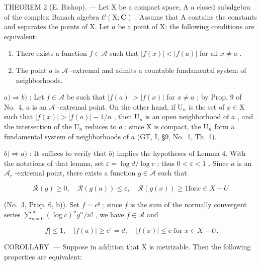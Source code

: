 THEOREM 2 (E. Bishop). --- Let X be a compact space, A a closed subalgebra of the complex Banach algebra \(\mathcal{C}(\mathrm{X};\mathbf{C})\) . Assume that A contains the constants and separates the points of X. Let \(a\) be a point of X; the following conditions are equivalent:

\begin{enumerate}
\def\labelenumi{\alph{enumi})}
\item
  There exists a function \(f \in \mathcal{A}\) such that \(|f(x)| < |f(a)|\) for all \(x \neq a\) .
\item
  The point \(a\) is \(\mathcal{A}\) -extremal and admits a countable fundamental system of neighborhoods.
\end{enumerate}

\(a) \Rightarrow b)\) : Let \(f \in \mathcal{A}\) be such that \(|f(a)| > |f(x)|\) for \(x \neq a\) ; by Prop. 9 of No.~4, \(a\) is an \(\mathcal{A}\) -extremal point. On the other hand, if \(\mathrm{U}_n\) is the set of \(x \in \mathrm{X}\) such that \(|f(x)| > |f(a)| - 1/n\) , then \(\mathrm{U}_n\) is an open neighborhood of \(a\) , and the intersection of the \(\mathrm{U}_n\) reduces to \(a\) ; since \(\mathrm{X}\) is compact, the \(\mathrm{U}_n\) form a fundamental system of neighborhoods of \(a\) (GT, I, §9, No.~1, Th. 1).

\(b) \Rightarrow a)\) : It suffices to verify that \(b)\) implies the hypotheses of Lemma 4. With the notations of that lemma, set \(\varepsilon = \log d / \log c\) ; thus \(0 < \varepsilon < 1\) . Since \(a\) is an \(\mathcal{A}_r\) -extremal point, there exists a function \(g \in \dot{\mathcal{A}}\) such that

\[
\mathcal {R} (g) \geqslant 0, \quad \mathcal {R} (g (a)) \leqslant \varepsilon , \quad \mathcal {R} (g (x)) \geqslant 1 \text {for} x \in X - U
\]

(No.~3, Prop. 6, b)). Set \(f = c^g\) ; since \(f\) is the sum of the normally convergent series \(\sum_{n=0}^{\infty} (\log c)^n g^n / n!\) , we have \(f \in \mathcal{A}\) and

\[
| f | \leqslant 1, \quad | f (a) | \geqslant c ^ {\varepsilon} = d, \quad | f (x) | \leqslant c \text { for } x \in X - U.\tag{Q.E.D.}
\]

COROLLARY. --- Suppose in addition that X is metrizable. Then the following properties are equivalent:

